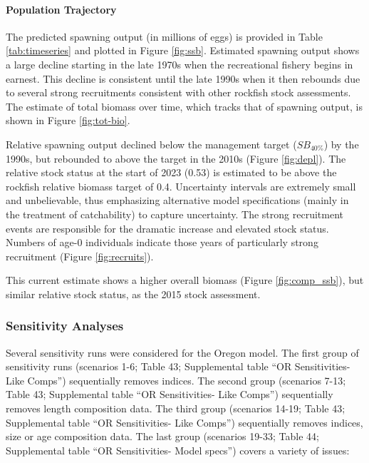 \documentclass[11pt,
  english,
  letterpaper,
]{article}
\begin{document}
\hypertarget{population-trajectory}{%
\paragraph{Population Trajectory}\label{population-trajectory}}

The predicted spawning output (in millions of eggs) is provided in Table \ref{tab:timeseries} and plotted in Figure \ref{fig:ssb}. Estimated spawning output shows a large decline starting in the late 1970s when the recreational fishery begins in earnest. This decline is consistent until the late 1990s when it then rebounds due to several strong recruitments consistent with other rockfish stock assessments. The estimate of total biomass over time, which tracks that of spawning output, is shown in Figure \ref{fig:tot-bio}.

Relative spawning output declined below the management target (\(SB_{40\%}\)) by the 1990s, but rebounded to above the target in the 2010s (Figure \ref{fig:depl}). The relative stock status at the start of 2023 (0.53) is estimated to be above the rockfish relative biomass target of 0.4. Uncertainty intervals are extremely small and unbelievable, thus emphasizing alternative model specifications (mainly in the treatment of catchability) to capture uncertainty. The strong recruitment events are responsible for the dramatic increase and elevated stock status. Numbers of age-0 individuals indicate those years of particularly strong recruitment (Figure \ref{fig:recruits}).

This current estimate shows a higher overall biomass (Figure \ref{fig:comp_ssb}), but similar relative stock status, as the 2015 stock assessment.

\hypertarget{sensitivity-analyses}{%
\subsubsection{Sensitivity Analyses}\label{sensitivity-analyses}}

Several sensitivity runs were considered for the Oregon model. The first group of sensitivity runs (scenarios 1-6; Table 43; Supplemental table ``OR Sensitivities- Like Comps'') sequentially removes indices. The second group (scenarios 7-13; Table 43; Supplemental table ``OR Sensitivities- Like Comps'') sequentially removes length composition data. The third group (scenarios 14-19; Table 43; Supplemental table ``OR Sensitivities- Like Comps'') sequentially removes indices, size or age composition data. The last group (scenarios 19-33; Table 44; Supplemental table ``OR Sensitivities- Model specs'') covers a variety of issues:
\end{document}
